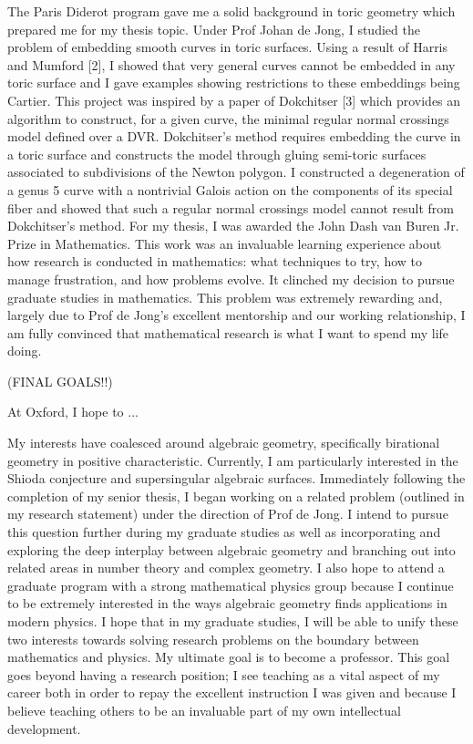 \documentclass[10pt]{amsart}
\begin{document}
\par
The Paris Diderot program gave me a solid background in toric geometry which prepared me for my thesis topic. Under Prof Johan de Jong, I studied the problem of embedding smooth curves in toric surfaces. Using a result of Harris and Mumford [2], I showed that very general curves cannot be embedded in any toric surface and I gave examples showing restrictions to these embeddings being Cartier. This project was inspired by a paper of Dokchitser [3] which provides an algorithm to construct, for a given curve, the minimal regular normal crossings model defined over a DVR. Dokchitser's method requires embedding the curve in a toric surface and constructs the model through gluing semi-toric surfaces associated to subdivisions of the Newton polygon. I constructed a degeneration of a genus 5 curve with a nontrivial Galois action on the components of its special fiber and showed that such a regular normal crossings model cannot result from Dokchitser's method. For my thesis, I was awarded the John Dash van Buren Jr. Prize in Mathematics. This work was an invaluable learning experience about how research is conducted in mathematics: what techniques to try, how to manage frustration, and how problems evolve. It clinched my decision to pursue graduate studies in mathematics. This problem was extremely rewarding and, largely due to Prof de Jong’s excellent mentorship and our working relationship, I am fully convinced that mathematical research is what I want to spend my life doing.  

(FINAL GOALS!!)

At Oxford, I hope to ...



My interests have coalesced around algebraic geometry, specifically birational geometry in positive characteristic. Currently, I am particularly interested in the Shioda conjecture and supersingular algebraic surfaces. Immediately following the completion of my senior thesis, I began working on a related problem (outlined in my research statement) under the direction of Prof de Jong. I intend to pursue this question further during my graduate studies as well as incorporating and exploring the deep interplay between algebraic geometry and branching out into related areas in number theory and complex geometry. I also hope to attend a graduate program with a strong mathematical physics group because I continue to be extremely interested in the ways algebraic geometry finds applications in modern physics. I hope that in my graduate studies, I will be able to unify these two interests towards solving research problems on the boundary between mathematics and physics. My ultimate goal is to become a professor. This goal goes beyond having a research position; I see teaching as a vital aspect of my career both in order to repay the excellent instruction I was given and because I believe teaching others to be an invaluable part of my own intellectual development.
\end{document}
